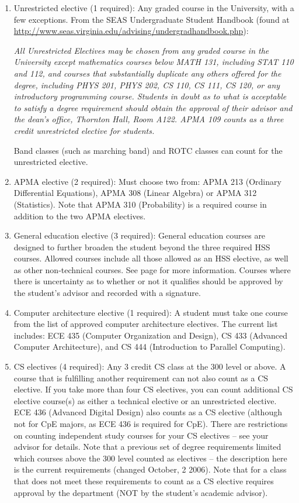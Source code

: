\documentclass[12pt,twoside]{article}
\begin{document}
\begin{enumerate}
\item Unrestricted elective (1 required): Any graded course in the
University, with a few exceptions.  From the SEAS Undergraduate
Student Handbook (found at
\url{http://www.seas.virginia.edu/advising/undergradhandbook.php}):

{\em All Unrestricted Electives may be chosen from any graded course
in the University except mathematics courses below MATH 131, including
STAT 110 and 112, and courses that substantially duplicate any others
offered for the degree, including PHYS 201, PHYS 202, CS 110, CS 111,
CS 120, or any introductory programming course. Students in doubt as
to what is acceptable to satisfy a degree requirement should obtain
the approval of their advisor and the dean's office, Thornton Hall,
Room A122. APMA 109 counts as a three credit unrestricted elective for
students.}

Band classes (such as marching band) and ROTC classes can count for
the unrestricted elective.

\item APMA elective (2 required): Must choose two from: APMA 213
(Ordinary Differential Equations), APMA 308 (Linear Algebra) or APMA
312 (Statistics).  Note that APMA 310 (Probability) is a required
course in addition to the two APMA electives.

\item General education elective (3 required): General education
courses are designed to further broaden the student beyond the three
required HSS courses.  Allowed courses include all those allowed as an
HSS elective, as well as other non-technical courses. See page
\pageref{geneduelectives} for more information. Courses where there
is uncertainty as to whether or not it qualifies should be
approved by the student's advisor and recorded with a signature.

\item \label{comparchelective} Computer architecture elective (1
required): A student must take one course from the list of approved
computer architecture electives. The current list includes: ECE 435
(Computer Organization and Design), CS 433 (Advanced Computer
Architecture), and CS 444 (Introduction to Parallel Computing).

\item CS electives (4 required): Any 3 credit CS class at the 300
level or above.  A course that is fulfilling another requirement can
not also count as a CS elective.  If you take more than four CS
electives, you can count additional CS elective course(s) as either
a technical elective or an unrestricted elective.  ECE 436 (Advanced
Digital Design) also counts as a CS elective (although not for CpE
majors, as ECE 436 is required for CpE).  There are restrictions on
counting independent study courses for your CS electives -- see your
advisor for details.  Note that a previous set of degree requirements
limited which courses above the 300 level counted as electives -- the
description here is the current requirements (changed October, 2
2006).  Note that for a class that does not meet these requirements to
count as a CS elective requires approval by the department (NOT by the
student's academic advisor).


\end{enumerate}
\end{document}
